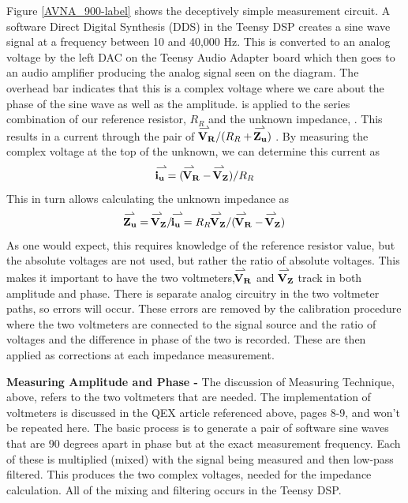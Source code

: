 %
Figure \ref{AVNA_900-label} shows the deceptively simple measurement circuit.  A software Direct Digital Synthesis (DDS) in the Teensy DSP creates a sine wave signal at a frequency between 10 and 40,000 Hz.  This is converted to an analog voltage by the left DAC on the Teensy Audio Adapter board which then goes to an audio amplifier producing the analog signal   seen on the diagram.
The overhead bar indicates that this is a complex voltage where we care about the phase of the sine wave as well as the amplitude.   is applied to the series combination of our reference resistor, \(R_R\) and the unknown impedance, .  This results in a current through the pair  of \(\vecr{$\mathbf{V_R}$}  /  (R_R +   \vecr{$\mathbf{Z_u}$})\) .  By measuring the complex voltage at the top of the unknown,  we can determine this current as
\begin{equation}
 \vecr{$\mathbf{i_u}$}=(\vecr{$\mathbf{V_R}$}-\vecr{$\mathbf{V_Z}$})/R_R
\end{equation}
 This in turn allows calculating the unknown impedance as
\begin{equation}
\vecr{$\mathbf{Z_u}$} =\vecr{$\mathbf{V_Z}$}/\vecr{$\mathbf{i_u}$}
                    =R_R\vecr{$\mathbf{V_Z}$}/(\vecr{$\mathbf{V_R}$}-\vecr{$\mathbf{V_Z}$})
\end{equation}
As one would expect, this requires knowledge of the reference resistor value, but the absolute voltages are not used, but rather the ratio of absolute voltages.  This makes it important to have the two voltmeters,\( \vecr{$\mathbf{V_R}$}\) and \( \vecr{$\mathbf{V_Z}$}\) track in both amplitude and phase.  There is separate analog circuitry in the two voltmeter paths, so errors will occur.  These errors are removed by the calibration procedure where the two voltmeters are connected to the signal source and the ratio  of voltages and the difference in phase of the two is recorded. These are then applied as corrections at each impedance measurement.

\textbf{Measuring Amplitude and Phase - }The discussion of Measuring Technique, above, refers to the two voltmeters that are needed.  The  implementation of voltmeters is discussed in the QEX article referenced above, pages 8-9,
and won't be repeated here.  The basic process is to generate a pair of software sine waves that are 90 degrees apart in phase but at the exact measurement frequency.  Each of these is multiplied (mixed) with the signal being measured and then low-pass filtered.  This produces the two complex voltages, needed for the impedance calculation.  All of the mixing and filtering occurs in the Teensy DSP.